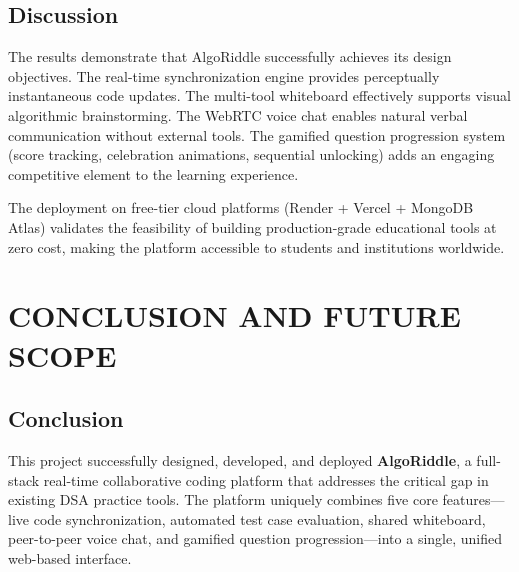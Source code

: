 \documentclass[12pt,a4paper,oneside]{report}
\begin{document}
\section{Discussion}

The results demonstrate that AlgoRiddle successfully achieves its design objectives. The real-time synchronization engine provides perceptually instantaneous code updates. The multi-tool whiteboard effectively supports visual algorithmic brainstorming. The WebRTC voice chat enables natural verbal communication without external tools. The gamified question progression system (score tracking, celebration animations, sequential unlocking) adds an engaging competitive element to the learning experience.

The deployment on free-tier cloud platforms (Render + Vercel + MongoDB Atlas) validates the feasibility of building production-grade educational tools at zero cost, making the platform accessible to students and institutions worldwide.




\chapter{CONCLUSION AND FUTURE SCOPE}

\section{Conclusion}

This project successfully designed, developed, and deployed \textbf{AlgoRiddle}, a full-stack real-time collaborative coding platform that addresses the critical gap in existing DSA practice tools. The platform uniquely combines five core features---live code synchronization, automated test case evaluation, shared whiteboard, peer-to-peer voice chat, and gamified question progression---into a single, unified web-based interface.
\end{document}
